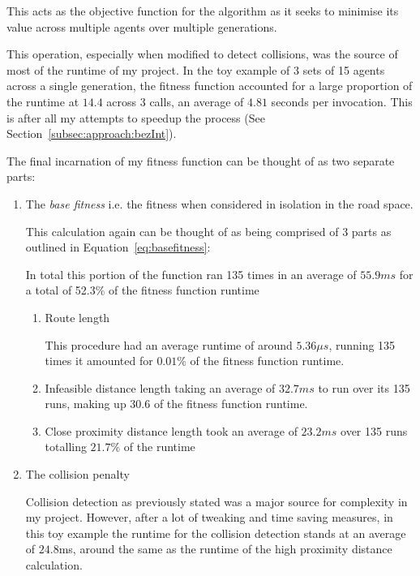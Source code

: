 This acts as the objective function for the algorithm as it seeks to minimise its value across multiple agents over multiple generations.

This operation, especially when modified to detect collisions, was the source of most of the runtime of my project. In the toy example of 3 sets of 15 agents across a single generation, the fitness function accounted for a large proportion of the runtime at $14.4$ across 3 calls, an average of $4.81$ seconds per invocation. This is after all my attempts to speedup the process (See Section~\ref{subsec:approach:bezInt}).

The final incarnation of my fitness function can be thought of as two separate parts:

\begin{enumerate}
  \item The \textit{base fitness} i.e. the fitness when considered in isolation in the road space.

        This calculation again can be thought of as being comprised of 3 parts as outlined in Equation~\ref{eq:basefitness}:

        In total this portion of the function ran 135 times in an average of $55.9ms$ for a total of 52.3\% of the fitness function runtime

        \begin{enumerate}
          \item Route length

                This procedure had an average runtime of around $5.36\mu s$, running 135 times it amounted for $0.01$\% of the fitness function runtime.

          \item Infeasible distance length taking an average of $32.7ms$ to run over its 135 runs, making up $30.6$ of the fitness function runtime.
          \item Close proximity distance length took an average of $23.2ms$ over 135 runs totalling $21.7$\% of the runtime

        \end{enumerate}


  \item The collision penalty

        Collision detection as previously stated was a major source for complexity in my project. However, after a lot of tweaking and time saving measures, in this toy example the runtime for the collision detection stands at an average of $24.8$ms, around the same as the runtime of the high proximity distance calculation.
\end{enumerate}


